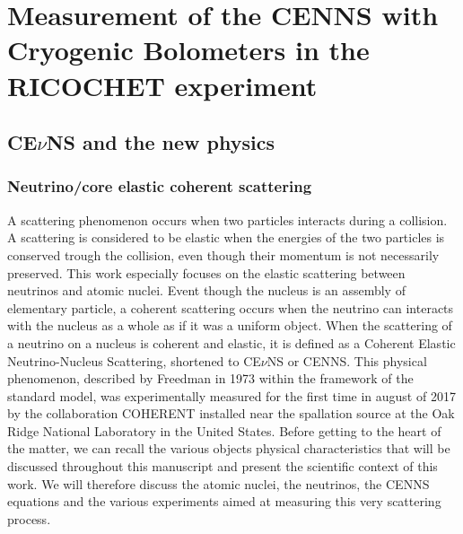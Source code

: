 
\chapter{Measurement of the CENNS with Cryogenic Bolometers in the RICOCHET experiment} %

\label{ChapterIntro} %


\section{CE$\nu$NS and the new physics}

\subsection{Neutrino/core elastic coherent scattering}

A scattering phenomenon occurs when two particles interacts during a collision. A scattering is considered to be elastic when the energies of the two particles is conserved trough the collision, even though their momentum is not necessarily preserved. 
This work especially focuses on the elastic scattering between neutrinos and atomic nuclei. Event though the nucleus is an assembly of elementary particle, a coherent scattering occurs when the neutrino can interacts with the nucleus as a whole as if it was a uniform object.
When the scattering of a neutrino on a nucleus is coherent and elastic, it is defined as a Coherent Elastic Neutrino-Nucleus Scattering, shortened to CE$\nu$NS or CENNS.
This physical phenomenon, described by Freedman in 1973 within the framework of the standard model, was experimentally measured for the first time in august of 2017 by the collaboration COHERENT installed near the spallation source at the Oak Ridge National Laboratory in the United States.
Before getting to the heart of the matter, we can recall the various objects physical characteristics that will be discussed throughout this manuscript and present the scientific context of this work.
We will therefore discuss the atomic nuclei, the neutrinos, the CENNS equations and the various experiments aimed at measuring this very scattering process.


